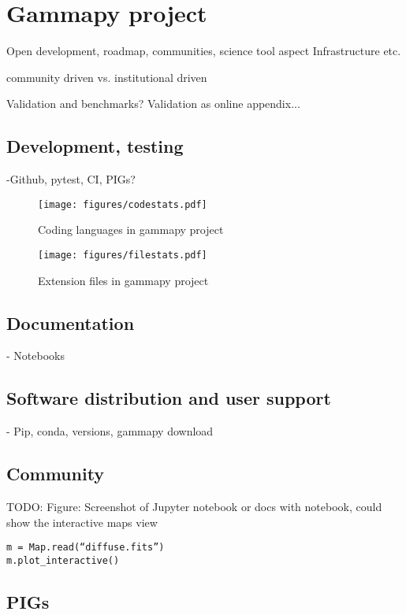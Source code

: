 \section{Gammapy project}
\label{sec:gammapy-project}

Open development, roadmap, communities, science tool aspect Infrastructure etc.

community driven vs. institutional driven

Validation and benchmarks? Validation as online appendix...

\subsection{Development, testing}
\label{ssec:development-testing}
-Github, pytest, CI, PIGs?


\begin{figure}[t]
	\centering
	\texttt{[image: figures/codestats.pdf]}
    \caption{
        Coding languages in gammapy project
    }
	\label{fig:codestats:lang}
\end{figure}

\begin{figure}[t]
	\centering
	\texttt{[image: figures/filestats.pdf]}
    \caption{
        Extension files in gammapy project
    }
	\label{fig:codestats:file}
\end{figure}

\subsection{Documentation}
\label{ssec:documentation}

- Notebooks

\subsection{Software distribution and user support}
\label{ssec:software-distribution-and-user-support}
- Pip, conda, versions, gammapy download

\subsection{Community}
\label{ssec:community}
TODO: Figure: Screenshot of Jupyter notebook or docs with notebook, could show
the interactive maps view
\begin{verbatim}
m = Map.read(“diffuse.fits”)
m.plot_interactive()
\end{verbatim}

\subsection{PIGs}
\label{ssec:pigs}
